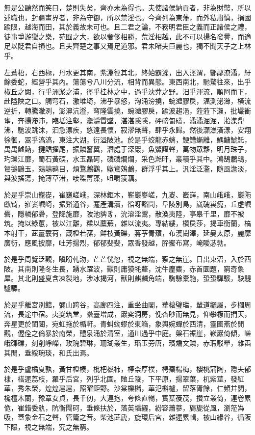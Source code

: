 無是公聽然而笑曰，楚則失矣，齊亦未為得也。夫使諸侯納貢者，非為財幣，所以述職也，封疆畫界者，非為守御，所以禁淫也。今齊列為東藩，而外私肅慎，捐國踰限，越海而田，其於義故未可也。且二君之論，不務明君臣之義而正諸侯之禮，徒事爭游獵之樂，苑囿之大，欲以奢侈相勝，荒淫相越，此不可以揚名發譽，而適足以貶君自損也。且夫齊楚之事又焉足道邪。君未睹夫巨麗也，獨不聞天子之上林乎。

左蒼梧，右西極，丹水更其南，紫淵徑其北，終始霸滻，出入涇渭，酆鄗潦潏，紆餘委蛇，經營乎其內。蕩蕩兮八川分流，相背而異態。東西南北，馳騖往來，出乎椒丘之闕，行乎洲淤之浦，徑乎桂林之中，過乎泱莽之野。汨乎渾流，順阿而下，赴隘陜之口。觸穹石，激堆埼，沸乎暴怒，洶涌滂撓，蜿灗膠戾，湢測泌瀄，橫流逆折，轉騰潎洌，澎濞沆瀣，穹隆雲撓，蜿灗膠戾，踰波趨浥，蒞蒞下瀨，批壧衝壅，奔揚滯沛，臨坻注壑，瀺灂霣墜，湛湛隱隱，砰磅訇礚，潏潏淈淈，湁潗鼎沸，馳波跳沫，汩急漂疾，悠遠長懷，寂漻無聲，肆乎永歸。然後灝溔潢漾，安翔徐徊，翯乎滈滈，東注大湖，衍溢陂池。於是乎蛟龍赤螭，鯁鰽螹離，鰅鳙鯱魠，禺禺鱋魶，揵鰭擢尾，振鱗奮翼，潛處于深巖，魚鱉讙聲，萬物眾夥，明月珠子，玓瓅江靡，蜀石黃碝，水玉磊砢，磷磷爛爛，采色澔旰，叢積乎其中。鴻鵠鷫鴇，鴐鵝鸀玉，鵁鶄鹮目，煩鶩鷛鸜，鷻鴜鵁鸕，群浮乎其上。汎淫泛濫，隨風澹淡，與波搖蕩，掩薄草渚，唼喋菁藻，咀嚼蔆藕。

於是乎崇山巃嵸，崔巍嵯峨，深林鉅木，嶄巖嵾嵯，九嵏、嶻嶭，南山峨峨，巖陁甗锜，嶊崣崛崎，振谿通谷，蹇產溝瀆，谽呀豁閜，阜陵別島，崴磈嵔瘣，丘虛崛礨，隱轔郁礨，登降施靡，陂池貏豸，沇溶淫鬻，散渙夷陸，亭皋千里，靡不被筑。掩以綠蕙，被以江離，糅以蘪蕪，雜以流夷。專結縷，欑戾莎，揭車衡蘭，槁本射干，茈薑蘘荷，葴橙若蓀，鮮枝黃礫，蔣芧青薠，布濩閎澤，延曼太原，麗靡廣衍，應風披靡，吐芳揚烈，郁郁斐斐，眾香發越，肸蠁布寫，崦瞹苾勃。

於是乎周覽泛觀，瞋盼軋沕，芒芒恍忽，視之無端，察之無崖。日出東沼，入於西陂。其南則隆冬生長，踴水躍波，獸則庸獏牦犛，沈牛麈麋，赤首圜題，窮奇象犀。其北則盛夏含凍裂地，涉冰揭河，獸則麒麟角端，騊駼橐駞，蛩蛩驒騱，駃騠驢騾。

於是乎離宮別館，彌山跨谷，高廊四注，重坐曲閣，華榱璧璫，輦道纚屬，步櫩周流，長途中宿。夷嵏筑堂，纍臺增成，巖穾洞房，俛杳眇而無見，仰攀橑而捫天，奔星更於閨闥，宛虹拖於楯軒。青虯蚴蟉於東箱，象輿婉蟬於西清，靈圉燕於閒觀，偓佺之倫暴於南榮，醴泉涌於清室，通川過乎中庭。槃石裖崖，嵚巖倚傾，嵯峨磼礏，刻削崢嶸，玫瑰碧琳，珊瑚叢生，瑉玉旁唐，璸斒文鱗，赤瑕駁犖，雜臿其閒，垂綏琬琰，和氏出焉。

於是乎盧橘夏孰，黃甘橙楱，枇杷橪柿，楟柰厚樸，梬棗楊梅，櫻桃蒲陶，隱夫郁棣，榙遝荔枝，羅乎后宮，列乎北園。貤丘陵，下平原，揚翠葉，杌紫莖，發紅華，秀朱榮，煌煌扈扈，照曜鉅野。沙棠櫟櫧，華氾檘櫨，留落胥餘，仁頻并閭，欃檀木蘭，豫章女貞，長千仞，大連抱，夸條直暢，實葉葰茂，攢立叢倚，連卷累佹，崔錯委骫，阬衡閜砢，垂條扶於，落英幡纚，紛容蕭蔘，旖旎從風，瀏蒞芔吸，蓋象金石之聲，管籥之音。柴池茈虒，旋環后宮，雜遝累輯，被山緣谷，循阪下隰，視之無端，究之無窮。

